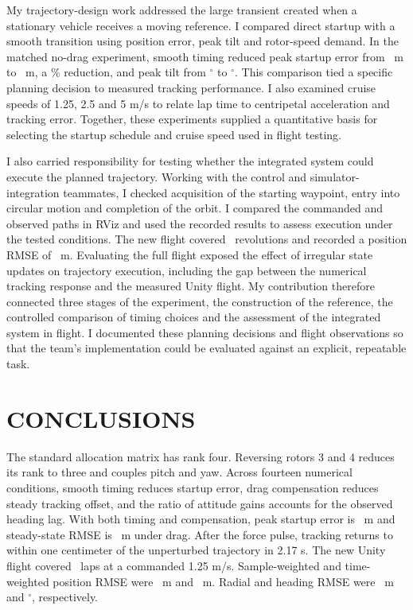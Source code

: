 \documentclass[letterpaper,10pt,conference]{ieeeconf}
\begin{document}
My trajectory-design work addressed the large transient created when a stationary vehicle receives a moving reference. I compared direct startup with a smooth transition using position error, peak tilt and rotor-speed demand. In the matched no-drag experiment, smooth timing reduced peak startup error from \NomStart\ m to \SmoothStart\ m, a \StartGain\% reduction, and peak tilt from \NomTilt$^\circ$ to \SmoothTilt$^\circ$. This comparison tied a specific planning decision to measured tracking performance. I also examined cruise speeds of 1.25, 2.5 and 5 m/s to relate lap time to centripetal acceleration and tracking error. Together, these experiments supplied a quantitative basis for selecting the startup schedule and cruise speed used in flight testing.

I also carried responsibility for testing whether the integrated system could execute the planned trajectory. Working with the control and simulator-integration teammates, I checked acquisition of the starting waypoint, entry into circular motion and completion of the orbit. I compared the commanded and observed paths in RViz and used the recorded results to assess execution under the tested conditions. The new flight covered \FlightLaps\ revolutions and recorded a position RMSE of \FlightPos\ m. Evaluating the full flight exposed the effect of irregular state updates on trajectory execution, including the gap between the numerical tracking response and the measured Unity flight. My contribution therefore connected three stages of the experiment, the construction of the reference, the controlled comparison of timing choices and the assessment of the integrated system in flight. I documented these planning decisions and flight observations so that the team's implementation could be evaluated against an explicit, repeatable task.

\balance
\section{CONCLUSIONS}
The standard allocation matrix has rank four. Reversing rotors 3 and 4 reduces its rank to three and couples pitch and yaw. Across fourteen numerical conditions, smooth timing reduces startup error, drag compensation reduces steady tracking offset, and the ratio of attitude gains accounts for the observed heading lag. With both timing and compensation, peak startup error is \JointStart\ m and steady-state RMSE is \JointSteady\ m under drag. After the force pulse, tracking returns to within one centimeter of the unperturbed trajectory in 2.17 s. The new Unity flight covered \FlightLaps\ laps at a commanded 1.25 m/s. Sample-weighted and time-weighted position RMSE were \FlightPos\ m and \FlightTimePos\ m. Radial and heading RMSE were \FlightRad\ m and \FlightYaw$^\circ$, respectively.
\end{document}

